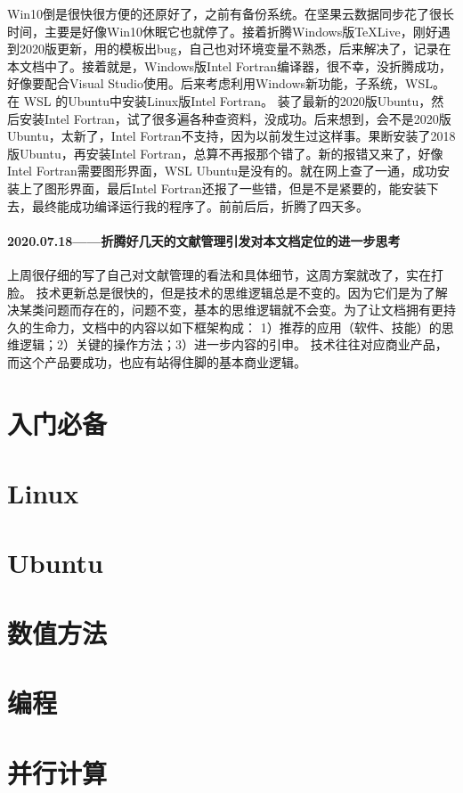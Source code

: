 \documentclass[cn,11pt,chinese,twoside]{elegantbook}
\begin{document}
Win10倒是很快很方便的还原好了，之前有备份系统。在坚果云数据同步花了很长时间，主要是好像Win10休眠它也就停了。接着折腾Windows版\TeX Live，刚好遇到2020版更新，用的模板出bug，自己也对环境变量不熟悉，后来解决了，记录在本文档中了。接着就是，Windows版Intel Fortran编译器，很不幸，没折腾成功，好像要配合Visual Studio使用。后来考虑利用Windows新功能，子系统，WSL。在 WSL 的Ubuntu中安装Linux版Intel Fortran。 装了最新的2020版Ubuntu，然后安装Intel Fortran，试了很多遍各种查资料，没成功。后来想到，会不是2020版Ubuntu，太新了，Intel Fortran不支持，因为以前发生过这样事。果断安装了2018版Ubuntu，再安装Intel Fortran，总算不再报那个错了。新的报错又来了，好像Intel Fortran需要图形界面，WSL Ubuntu是没有的。就在网上查了一通，成功安装上了图形界面，最后Intel Fortran还报了一些错，但是不是紧要的，能安装下去，最终能成功编译运行我的程序了。前前后后，折腾了四天多。




\subsection*{2020.07.18——折腾好几天的文献管理引发对本文档定位的进一步思考}
上周很仔细的写了自己对文献管理的看法和具体细节，这周方案就改了，实在打脸。
技术更新总是很快的，但是技术的思维逻辑总是不变的。因为它们是为了解决某类问题而存在的，问题不变，基本的思维逻辑就不会变。为了让文档拥有更持久的生命力，文档中的内容以如下框架构成：
1）推荐的应用（软件、技能）的思维逻辑；2）关键的操作方法；3）进一步内容的引申。
技术往往对应商业产品，而这个产品要成功，也应有站得住脚的基本商业逻辑。




\part{入门必备}


\part{Linux}







\part{Ubuntu}


\part{数值方法}


\part{编程}



\part{并行计算}

\end{document}
